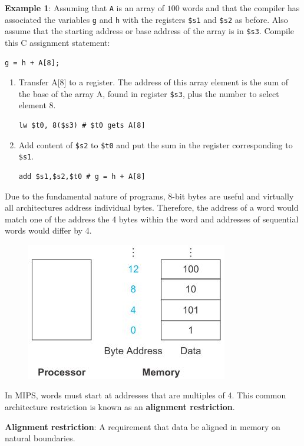\documentclass[10pt,a4paper]{article}
\begin{document}
\textbf{Example 1}: Assuming that \texttt{A} is an array of $100$ words and that the compiler has
associated the variables \texttt{g} and \texttt{h} with the registers \texttt{\$s1} and
\texttt{\$s2} as before. Also assume that the starting address or base address of the array is in
\texttt{\$s3}. Compile this C assignment statement:
\begin{lstlisting}[numbers=none]
    g = h + A[8];
\end{lstlisting}
\begin{enumerate}
    \item Transfer A[8] to a register. The address of this array element is the sum of the base of
    the array A, found in register \texttt{\$s3}, plus the number to select element 8.
    \begin{lstlisting}[numbers=none]
        lw $t0, 8($s3) # $t0 gets A[8]
    \end{lstlisting}
    \item  Add content of \texttt{\$s2} to \texttt{\$t0} and put the sum in the register corresponding to \texttt{\$s1}.
    \begin{lstlisting}[numbers=none]
        add $s1,$s2,$t0 # g = h + A[8]
    \end{lstlisting} 
\end{enumerate}

Due to the fundamental nature of programs, 8-bit bytes are useful and virtually all architectures
address individual bytes. Therefore, the address of a word would match one of the address the 4
bytes within the word and addresses of sequential words would differ by 4. 
\begin{figure} [h!]
    \centering
    \includegraphics[scale=0.6]{4 bytes.JPG}
\end{figure}
In MIPS, words must start at addresses that are multiples of 4. This common architecture restriction
is known as an \textbf{alignment restriction}.
\begin{tcolorbox}[breakable,colback=white]
\textbf{Alignment restriction}: A requirement that data be aligned in memory on natural boundaries.
\end{tcolorbox}
\end{document}
